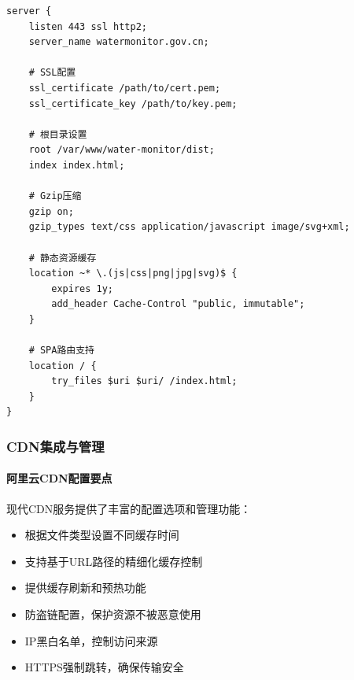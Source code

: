 \begin{lstlisting}
server {
    listen 443 ssl http2;
    server_name watermonitor.gov.cn;
    
    # SSL配置
    ssl_certificate /path/to/cert.pem;
    ssl_certificate_key /path/to/key.pem;
    
    # 根目录设置
    root /var/www/water-monitor/dist;
    index index.html;
    
    # Gzip压缩
    gzip on;
    gzip_types text/css application/javascript image/svg+xml;
    
    # 静态资源缓存
    location ~* \.(js|css|png|jpg|svg)$ {
        expires 1y;
        add_header Cache-Control "public, immutable";
    }
    
    # SPA路由支持
    location / {
        try_files $uri $uri/ /index.html;
    }
}
\end{lstlisting}

\hypertarget{cdnux96c6ux6210ux4e0eux7ba1ux7406}{%
\subsubsection{CDN集成与管理}\label{cdnux96c6ux6210ux4e0eux7ba1ux7406}}

\hypertarget{ux963fux91ccux4e91cdnux914dux7f6eux8981ux70b9}{%
\paragraph{阿里云CDN配置要点}\label{ux963fux91ccux4e91cdnux914dux7f6eux8981ux70b9}}

现代CDN服务提供了丰富的配置选项和管理功能：


\begin{itemize}
\tightlist
\item
  根据文件类型设置不同缓存时间
\item
  支持基于URL路径的精细化缓存控制
\item
  提供缓存刷新和预热功能
\end{itemize}


\begin{itemize}
\tightlist
\item
  防盗链配置，保护资源不被恶意使用
\item
  IP黑白名单，控制访问来源
\item
  HTTPS强制跳转，确保传输安全
\end{itemize}

